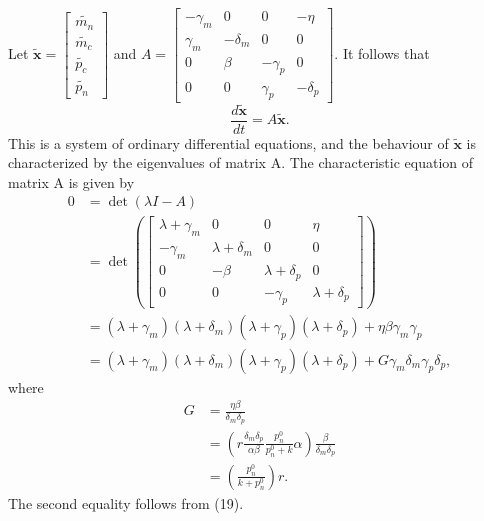 \documentclass[12pt]{article}
\renewcommand{\(}{\left (}
\renewcommand{\)}{\right )}
\begin{document}
Let $\widetilde{\mathbf{x}} =
\begin{bmatrix}
\widetilde{m_n}  \\
\widetilde{m_c}  \\
\widetilde{p_c}  \\
\widetilde{p_n}
\end{bmatrix}$ and $A =
\begin{bmatrix}
-\gamma_m & 0 & 0 & -\eta \\
\gamma_m &  - \delta_m & 0 & 0 \\
0 &  \beta & - \gamma_p & 0 \\
0 & 0 & \gamma_p &  - \delta_p
\end{bmatrix}.$
It follows that
\begin{equation}
    \frac{d\widetilde{\mathbf{x}}}{dt} = A \widetilde{\mathbf{x}}.
\end{equation} This is a system of ordinary differential equations, and the behaviour of $\widetilde{\mathbf{x}}$ is characterized by the eigenvalues of matrix A. The characteristic equation of matrix A is given by
\begin{align}
    0 &= \det(\lambda I - A) \\
    &= \det \left(\begin{bmatrix}
\lambda + \gamma_m & 0 & 0 & \eta \\
-\gamma_m &  \lambda + \delta_m & 0 & 0 \\
0 &  -\beta & \lambda+\delta_p & 0 \\
0 & 0 & -\gamma_p &  \lambda+ \delta_p
\end{bmatrix}\right) \\
&= (\lambda + \gamma_m)(\lambda + \delta_m)(\lambda + \gamma_p)(\lambda + \delta_p) + \eta \beta \gamma_m \gamma_p \\
&= (\lambda + \gamma_m)(\lambda + \delta_m)(\lambda + \gamma_p)(\lambda + \delta_p) + G \gamma_m \delta_m \gamma_p \delta_p,
\end{align}
where \begin{align}
    G &= \frac{\eta \beta}{\delta_m \delta_p} \\
    &= \left(r \frac{\delta_m \delta_p}{\alpha \beta} \frac{p_n^0}{p_n^0 + k} \alpha\right) \frac{\beta}{\delta_m \delta_p} \\
    &= \left(\frac{p_n^0}{k+p_n^0}\right) r.
\end{align}
The second equality follows from (19).
\end{document}
